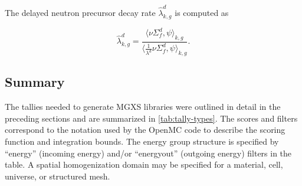 The delayed neutron precursor decay rate $\hat{\lambda}_{k,g}^{d}$ is computed as

\begin{equation}
\label{eqn:lambda}
\hat{\lambda}_{k,g}^{d} = \frac{\langle \nu \Sigma_f^d, \psi \rangle_{k,g}}{\Big\langle \frac{1}{\lambda^{d}} \nu \Sigma_f^d, \psi \Big\rangle_{k,g}}.
\end{equation}

\subsection{Summary}
\label{subsec:tally-types-summary}

The tallies needed to generate MGXS libraries were outlined in detail in the preceding sections and are summarized in \cref{tab:tally-types}. The scores and filters correspond to the notation used by the OpenMC code to describe the scoring function and integration bounds. The energy group structure is specified by ``energy'' (incoming energy) and/or ``energyout'' (outgoing energy) filters in the table. A spatial homogenization domain may be specified for a material, cell, universe, or structured mesh.

